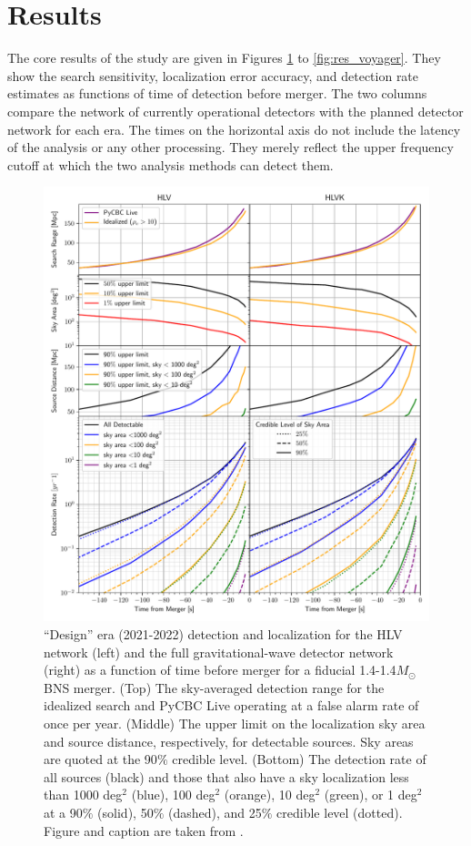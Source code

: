 \section{Results}
The core results of the study are given in Figures \ref{fig:res_design} to \ref{fig:res_voyager}. They show the search sensitivity, localization error accuracy, and detection rate estimates as functions of time of detection before merger. The two columns compare the network of currently operational detectors with the planned detector network for each era. The times on the horizontal axis do not include the latency of the analysis or any other processing. They merely reflect the upper frequency cutoff at which the two analysis methods can detect them.
\begin{figure}
	\centering
	\includegraphics[width=\textwidth]{chapters/forecasting/images/design.pdf}
	\caption[``Design'' era detection ranges, localizations, distances, and merger rates]{``Design'' era (2021-2022) detection and localization for the HLV network (left) and the full gravitational-wave detector network (right) as a function of time before merger for a fiducial 1.4-1.4$M_\odot$ BNS merger. (Top) The sky-averaged detection range for the idealized search and PyCBC Live operating at a false alarm rate of once per year. (Middle) The upper limit on the localization sky area and source distance, respectively, for detectable sources. Sky areas are quoted at the 90$\%$ credible level. (Bottom) The detection rate of all sources (black) and those that also have a sky localization less than 1000 deg$^2$ (blue), 100 deg$^2$ (orange), 10 deg$^2$ (green), or 1 deg$^2$ at a 90$\%$ (solid), 50$\%$ (dashed), and 25$\%$ credible level (dotted). Figure and caption are taken from \cite{Nitz:2020vym}.}\label{fig:res_design}
\end{figure}
